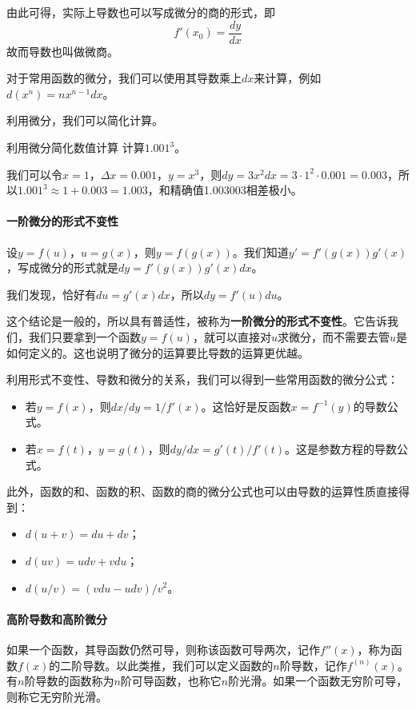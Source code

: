 由此可得，实际上导数也可以写成微分的商的形式，即
\begin{equation}
    f'(x_0) = \frac{dy}{dx}
\end{equation}
故而导数也叫做微商。

对于常用函数的微分，我们可以使用其导数乘上$dx$来计算，例如$d(x^n) = nx^{n-1} dx$。

利用微分，我们可以简化计算。
\begin{example}{利用微分简化数值计算}{}
计算$1.001^{3}$。

\tcblower

我们可以令$x = 1$，$\Delta x = 0.001$，$y = x^3$，则$dy = 3x^2 dx = 3 \cdot 1^2 \cdot 0.001 = 0.003$，所以$1.001^3 \approx 1 + 0.003 = 1.003$，和精确值1.003003相差极小。
\end{example}


\paragraph{一阶微分的形式不变性} 设$y = f(u)$，$u = g(x)$，则$y = f(g(x))$。我们知道$y' = f'(g(x)) g'(x)$，写成微分的形式就是$dy =  f'(g(x)) g'(x) dx$。

我们发现，恰好有$du = g'(x) dx$，所以$dy = f'(u) du$。

这个结论是一般的，所以具有普适性，被称为\textbf{一阶微分的形式不变性}。它告诉我们，我们只要拿到一个函数$y = f(u)$，就可以直接对$u$求微分，而不需要去管$u$是如何定义的。这也说明了微分的运算要比导数的运算更优越。

利用形式不变性、导数和微分的关系，我们可以得到一些常用函数的微分公式：
\begin{itemize}
    \item 若$y = f(x)$，则$dx/dy = 1/f'(x)$。这恰好是反函数$x = f^{-1}(y)$的导数公式。
    \item 若$x = f(t)$，$y = g(t)$，则$dy/dx = g'(t)/f'(t)$。这是参数方程的导数公式。
\end{itemize}
此外，函数的和、函数的积、函数的商的微分公式也可以由导数的运算性质直接得到：
\begin{itemize}
    \item $d(u+v) = du + dv$；
    \item $d(uv) = u dv + v du$；
    \item $d(u/v) = (v du - u dv)/v^2$。
\end{itemize}

\paragraph{高阶导数和高阶微分} 如果一个函数，其导函数仍然可导，则称该函数可导两次，记作$f''(x)$，称为函数$f(x)$的二阶导数。以此类推，我们可以定义函数的$n$阶导数，记作$f^{(n)}(x)$。有$n$阶导数的函数称为$n$阶可导函数，也称它$n$阶光滑。如果一个函数无穷阶可导，则称它无穷阶光滑。

